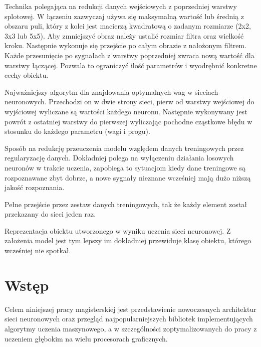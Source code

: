 \documentclass[12pt,a4paper,twoside,titlepage,openright]{book}
\begin{document}
\begin{description}[style=nextline]
	\item[Łączenie (ang. pooling)] Technika polegająca na redukcji danych wejściowych z poprzedniej warstwy splotowej. W łączeniu zazwyczaj używa się maksymalną wartość lub średnią z obszaru puli, który z kolei jest macierzą kwadratową o zadanym rozmiarze (2x2, 3x3 lub 5x5). Aby zmniejszyć obraz należy ustalić rozmiar filtra oraz wielkość kroku. Następnie wykonuje się przejście po całym obrazie z nałożonym filtrem. Każde przesunięcie po sygnałach z warstwy poprzedniej zwraca nową wartość dla warstwy łączącej. Pozwala to ograniczyć ilość parametrów i wyodrębnić konkretne cechy obiektu.
	\item[Wsteczna propagacja błędu] Najważniejszy algorytm dla znajdowania optymalnych wag w sieciach neuronowych. Przechodzi on w dwie strony sieci, pierw od warstwy wejściowej do wyjściowej wyliczane są wartości każdego neuronu. Następnie wykonywany jest powrót z ostatniej warstwy do pierwszej wyliczając pochodne cząstkowe błędu w stosunku do każdego parametru (wagi i progu).
	\item[Wyrzucanie połączeń (ang. dropout)] Sposób na redukcję przeuczenia modelu względem danych treningowych przez regularyzację danych. Dokładniej polega na wyłączeniu działania losowych neuronów w trakcie uczenia, zapobiega to sytuacjom kiedy dane treningowe są rozpoznawane zbyt dobrze, a nowe sygnały nieznane wcześniej mają dużo niższą jakość rozpoznania.
	\item[Epoka] Pełne przejście przez zestaw danych treningowych, tak że każdy element został przekazany do sieci jeden raz.
	\item[Model] Reprezentacja obiektu utworzonego w wyniku uczenia sieci neuronowej. Z założenia model jest tym lepszy im dokładniej przewiduje klasę obiektu, którego wcześniej nie spotkał.
\end{description}
 

\chapter*{Wstęp}
Celem niniejszej pracy magisterskiej jest przedstawienie nowoczesnych architektur sieci neuronowych oraz przegląd najpopularniejszych bibliotek implementujących algorytmy uczenia maszynowego, a w szczególności zoptymalizowanych do pracy z uczeniem głębokim na wielu procesorach graficznych. 
\end{document}
